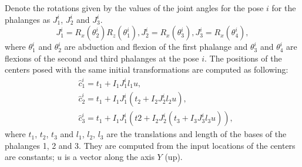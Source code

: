 \begin{DRAFT}
Denote the rotations given by the values of the joint angles for the pose $i$ for the phalanges as $J_1^i$, $J_2^i$ and $J_3^i$.
\begin{equation*}
J_1^i = R_x(\theta_2^i) R_z(\theta_1^i),
J_2^i = R_x(\theta_3^i),
J_3^i =  R_x(\theta_4^i),
\end{equation*}
where $\theta_1^i$ and $\theta_2^i$ are abduction and flexion of the first phalange and $\theta_3^i$ and $\theta_4^i$ are flexions of the second and third phalanges at the pose $i$. 
The positions of the centers posed with the same initial transformations are computed as following:
\begin{align*}
& \hat{c}_1^i =  t_1 + I_1   J_1^i    l_1  u, \\
& \hat{c}_2^i = t_1 + I_1    J_1^i   (t_2 + I_2  J_2^i  l_2  u), \\
&\hat{c}_3^i =  t_1 + I_1    J_1^i   (t2 +  I_2   J_2^i  (t_3 + I_3  J_3^i  l_3 u)),
\end{align*}
where $t_1$, $t_2$, $t_3$ and $l_1$, $l_2$, $l_3$ are the translations and length of the bases of the phalanges 1, 2 and 3. They are computed from the input locations of the centers are constants; $u$ is a vector along the axis $Y$ (up).
\end{DRAFT}
